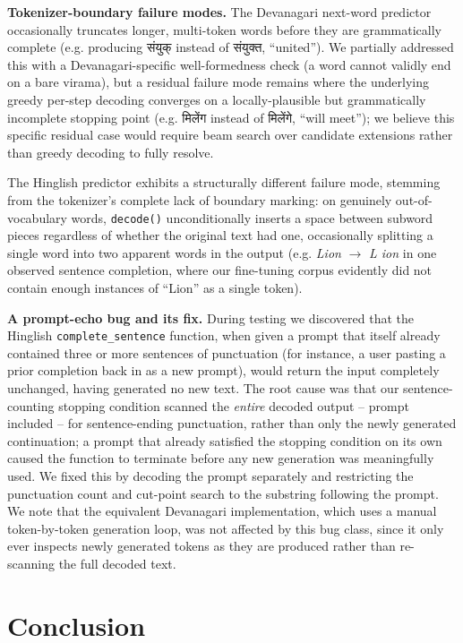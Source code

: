 \documentclass[11pt]{article}
\begin{document}
\textbf{Tokenizer-boundary failure modes.} The Devanagari next-word predictor occasionally truncates longer, multi-token words before they are grammatically complete (e.g. producing \texthindi{संयुक्} instead of \texthindi{संयुक्त}, ``united''). We partially addressed this with a Devanagari-specific well-formedness check (a word cannot validly end on a bare virama), but a residual failure mode remains where the underlying greedy per-step decoding converges on a locally-plausible but grammatically incomplete stopping point (e.g. \texthindi{मिलेंग} instead of \texthindi{मिलेंगे}, ``will meet''); we believe this specific residual case would require beam search over candidate extensions rather than greedy decoding to fully resolve.

The Hinglish predictor exhibits a structurally different failure mode, stemming from the tokenizer's complete lack of boundary marking: on genuinely out-of-vocabulary words, \texttt{decode()} unconditionally inserts a space between subword pieces regardless of whether the original text had one, occasionally splitting a single word into two apparent words in the output (e.g. \textit{Lion} $\to$ \textit{L ion} in one observed sentence completion, where our fine-tuning corpus evidently did not contain enough instances of ``Lion'' as a single token).

\textbf{A prompt-echo bug and its fix.} During testing we discovered that the Hinglish \texttt{complete\_sentence} function, when given a prompt that itself already contained three or more sentences of punctuation (for instance, a user pasting a prior completion back in as a new prompt), would return the input completely unchanged, having generated no new text. The root cause was that our sentence-counting stopping condition scanned the \emph{entire} decoded output -- prompt included -- for sentence-ending punctuation, rather than only the newly generated continuation; a prompt that already satisfied the stopping condition on its own caused the function to terminate before any new generation was meaningfully used. We fixed this by decoding the prompt separately and restricting the punctuation count and cut-point search to the substring following the prompt. We note that the equivalent Devanagari implementation, which uses a manual token-by-token generation loop, was not affected by this bug class, since it only ever inspects newly generated tokens as they are produced rather than re-scanning the full decoded text.

\section{Conclusion}
\end{document}
